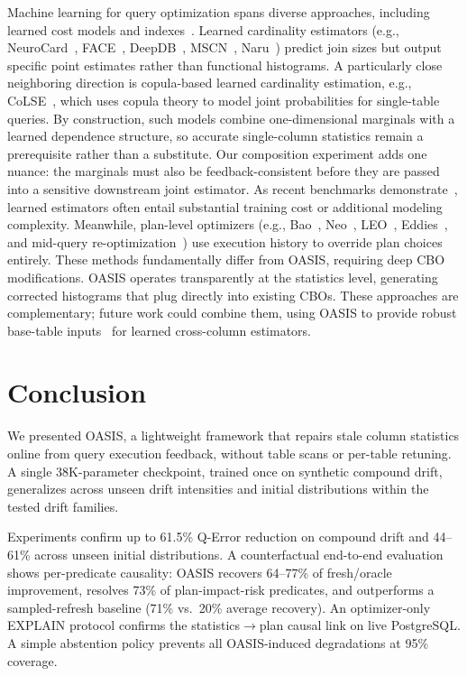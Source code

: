 \documentclass[runningheads]{llncs}
\begin{document}
Machine learning for query optimization spans diverse approaches, including learned cost models and indexes~\cite{kraska2018case,sun2019endtoend,wu2018towards}. Learned cardinality estimators (e.g., NeuroCard~\cite{yang2020neurocard}, FACE~\cite{yang2020face}, DeepDB~\cite{hilprecht2019deepdb}, MSCN~\cite{kipf2019learned}, Naru~\cite{yang2019deep}) predict join sizes but output specific point estimates rather than functional histograms. A particularly close neighboring direction is copula-based learned cardinality estimation, e.g., CoLSE~\cite{rathuwadu2025colse}, which uses copula theory to model joint probabilities for single-table queries. By construction, such models combine one-dimensional marginals with a learned dependence structure, so accurate single-column statistics remain a prerequisite rather than a substitute. Our composition experiment adds one nuance: the marginals must also be feedback-consistent before they are passed into a sensitive downstream joint estimator. As recent benchmarks demonstrate~\cite{dutt2021ready,han2021cardinality}, learned estimators often entail substantial training cost or additional modeling complexity. Meanwhile, plan-level optimizers (e.g., Bao~\cite{marcus2022bao}, Neo~\cite{marcus2019neo}, LEO~\cite{stillger2001leo}, Eddies~\cite{avnur2000eddies}, and mid-query re-optimization~\cite{kabra1998efficient}) use execution history to override plan choices entirely. These methods fundamentally differ from OASIS, requiring deep CBO modifications. OASIS operates transparently at the statistics level, generating corrected histograms that plug directly into existing CBOs. These approaches are complementary; future work could combine them, using OASIS to provide robust base-table inputs~\cite{leis2015good} for learned cross-column estimators.

\section{Conclusion}
\label{sec:conclusion}
We presented OASIS, a lightweight framework that repairs stale column statistics online from query execution feedback, without table scans or per-table retuning. A single 38K-parameter checkpoint, trained once on synthetic compound drift, generalizes across unseen drift intensities and initial distributions within the tested drift families.

Experiments confirm up to 61.5\% Q-Error reduction on compound drift and 44--61\% across unseen initial distributions. A counterfactual end-to-end evaluation shows per-predicate causality: OASIS recovers 64--77\% of fresh/oracle improvement, resolves 73\% of plan-impact-risk predicates, and outperforms a sampled-refresh baseline (71\% vs.\ 20\% average recovery). An optimizer-only EXPLAIN protocol confirms the statistics$\rightarrow$plan causal link on live PostgreSQL. A simple abstention policy prevents all OASIS-induced degradations at 95\% coverage.
\end{document}
